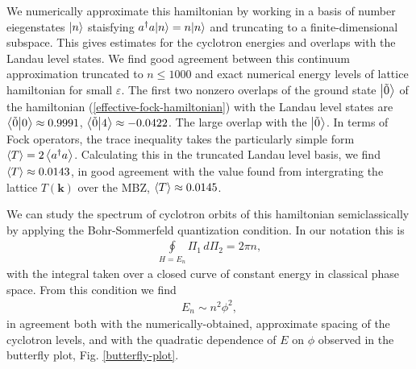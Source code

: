 \documentclass[aps,prb,twocolumn,letterpaper,twoside,nobalancelastpage,groupedaddress,amsmath,amssymb,floatfix,citeautoscript]{revtex4-1}
\begin{document}
We numerically approximate this hamiltonian by working in a basis of number eiegenstates $\ket{n}$ staisfying $a^{\dag}a{\ket{n}}=n{\ket{n}}$ and truncating to a finite-dimensional subspace. This gives estimates for the cyclotron energies and overlaps with the Landau level states. We find good agreement between this continuum approximation truncated to $n \leq 1000$ and exact numerical energy levels of lattice hamiltonian for small $\varepsilon$. The first two nonzero overlaps of the ground state $\ket{\tilde{0}}$ of the hamiltonian (\ref{effective-fock-hamiltonian}) with the Landau level states are $\braket{\tilde{0}}{0}\approx0.9991$, $\braket{\tilde{0}}{4}\approx-0.0422$. The large overlap with the $\ket{\tilde{0}}$. In terms of Fock operators, the trace inequality takes the particularly simple form $\expval{T} = 2\expval{a^{\dag}a}$\cite{bauer_quantum_2016}. Calculating this in the truncated Landau level basis, we find $\expval{T} \approx0.0143$, in good agreement with the value found from intergrating the lattice $T(\mathbf{k})$ over the MBZ, $\expval{T} \approx 0.0145$.

We can study the spectrum of cyclotron orbits of this hamiltonian semiclassically by applying the Bohr-Sommerfeld quantization condition. In our notation this is
\begin{align*}
\oint\limits_{H=E_n} \Pi_1\, d\Pi_2 = 2\pi n,
\end{align*}
with the integral taken over a closed curve of constant energy in classical phase space. From this condition we find
\begin{align*}
E_n \sim n^2\phi^2, 
\end{align*}
in agreement both with the numerically-obtained, approximate spacing of the cyclotron levels, and with the quadratic dependence of $E$ on $\phi$ observed in the butterfly plot, Fig. \ref{butterfly-plot}.
\end{document}
